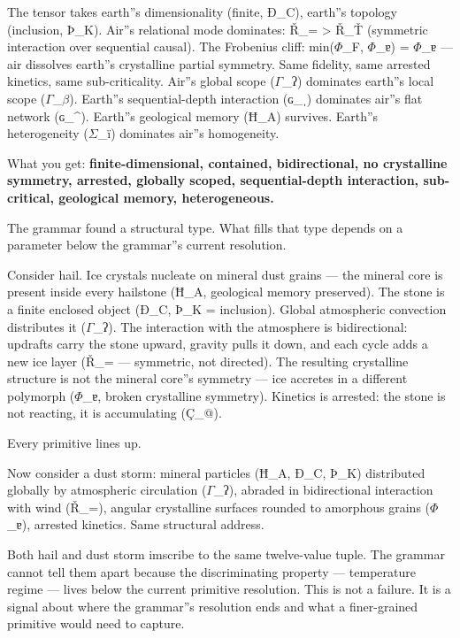 \documentclass[12pt,a4paper]{article}
\begin{document}
The tensor takes earth''s dimensionality (finite, Ð\_C), earth''s topology (inclusion, Þ\_K). Air''s relational mode dominates: Ř\_= \textgreater{} Ř\_Ť (symmetric interaction over sequential causal). The Frobenius cliff: min($\Phi$\_F, $\Phi$\_ɐ) = $\Phi$\_ɐ --- air dissolves earth''s crystalline partial symmetry. Same fidelity, same arrested kinetics, same sub-criticality. Air''s global scope ($\Gamma$\_ʔ) dominates earth''s local scope ($\Gamma$\_$\beta$). Earth''s sequential-depth interaction (ɢ\_ˌ) dominates air''s flat network (ɢ\_\^{}). Earth''s geological memory (Ħ\_A) survives. Earth''s heterogeneity ($\Sigma$\_ï) dominates air''s homogeneity.

What you get: \textbf{finite-dimensional, contained, bidirectional, no crystalline symmetry, arrested, globally scoped, sequential-depth interaction, sub-critical, geological memory, heterogeneous.}

The grammar found a structural type. What fills that type depends on a parameter below the grammar''s current resolution.

Consider hail. Ice crystals nucleate on mineral dust grains --- the mineral core is present inside every hailstone (Ħ\_A, geological memory preserved). The stone is a finite enclosed object (Ð\_C, Þ\_K = inclusion). Global atmospheric convection distributes it ($\Gamma$\_ʔ). The interaction with the atmosphere is bidirectional: updrafts carry the stone upward, gravity pulls it down, and each cycle adds a new ice layer (Ř\_= --- symmetric, not directed). The resulting crystalline structure is not the mineral core''s symmetry --- ice accretes in a different polymorph ($\Phi$\_ɐ, broken crystalline symmetry). Kinetics is arrested: the stone is not reacting, it is accumulating (Ç\_@).

Every primitive lines up.

Now consider a dust storm: mineral particles (Ħ\_A, Ð\_C, Þ\_K) distributed globally by atmospheric circulation ($\Gamma$\_ʔ), abraded in bidirectional interaction with wind (Ř\_=), angular crystalline surfaces rounded to amorphous grains ($\Phi$\_ɐ), arrested kinetics. Same structural address.

Both hail and dust storm imscribe to the same twelve-value tuple. The grammar cannot tell them apart because the discriminating property --- temperature regime --- lives below the current primitive resolution. This is not a failure. It is a signal about where the grammar''s resolution ends and what a finer-grained primitive would need to capture.
\end{document}
